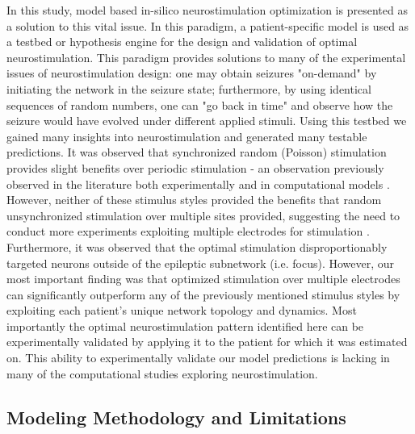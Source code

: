 \documentclass[11pt,a4paper,final]{article}
\begin{document}
In this study, model based in-silico neurostimulation optimization is presented as a solution to this vital issue.
In this paradigm, a patient-specific model is used as a testbed or hypothesis engine for the design and validation of optimal neurostimulation.
This paradigm provides solutions to many of the experimental issues of neurostimulation design: one may obtain seizures "on-demand" by initiating the network in the seizure state; furthermore, by using identical sequences of random numbers, one can "go back in time" and observe how the seizure would have evolved under different applied stimuli.
Using this testbed we gained many insights into neurostimulation and generated many testable predictions.
It was observed that synchronized random (Poisson) stimulation provides slight benefits over periodic stimulation - an observation previously observed in the literature both experimentally and in computational models \citep{wyckhuys10,buffel14}.
However, neither of these stimulus styles provided the benefits that random unsynchronized stimulation over multiple sites provided, suggesting the need to conduct more experiments exploiting multiple electrodes for stimulation \citep{cook13,van14}.
Furthermore, it was observed that the optimal stimulation disproportionably targeted neurons outside of the epileptic subnetwork (i.e. focus).
However, our most important finding was that optimized stimulation over multiple electrodes can significantly outperform any of the previously mentioned stimulus styles by exploiting each patient's unique network topology and dynamics.
Most importantly the optimal neurostimulation pattern identified here can be experimentally validated by applying it to the patient for which it was estimated on.
This ability to experimentally validate our model predictions is lacking in many of the computational studies exploring neurostimulation.

\subsection{Modeling Methodology and Limitations}
\end{document}
